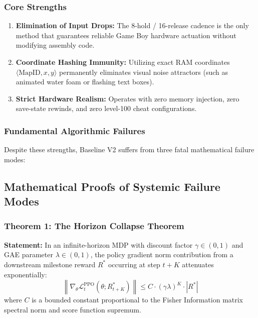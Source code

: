 \documentclass[conference]{IEEEtran}
\begin{document}
\subsubsection{Core Strengths}
\begin{enumerate}
    \item \textbf{Elimination of Input Drops:} The 8-hold / 16-release cadence is the only method that guarantees reliable Game Boy hardware actuation without modifying assembly code.
    \item \textbf{Coordinate Hashing Immunity:} Utilizing exact RAM coordinates $\langle \text{MapID}, x, y \rangle$ permanently eliminates visual noise attractors (such as animated water foam or flashing text boxes).
    \item \textbf{Strict Hardware Realism:} Operates with zero memory injection, zero save-state rewinds, and zero level-100 cheat configurations.
\end{enumerate}

\subsubsection{Fundamental Algorithmic Failures}
Despite these strengths, Baseline V2 suffers from three fatal mathematical failure modes:

\subsection{Mathematical Proofs of Systemic Failure Modes}

\subsubsection{Theorem 1: The Horizon Collapse Theorem}
\textbf{Statement:} In an infinite-horizon MDP with discount factor $\gamma \in (0, 1)$ and GAE parameter $\lambda \in (0, 1)$, the policy gradient norm contribution from a downstream milestone reward $R^*$ occurring at step $t+K$ attenuates exponentially:
\begin{equation}
\left\| \nabla_\theta \mathcal{L}_t^{\text{PPO}}(\theta; R_{t+K}^*) \right\| \le C \cdot (\gamma \lambda)^K \cdot |R^*|
\end{equation}
where $C$ is a bounded constant proportional to the Fisher Information matrix spectral norm and score function supremum.
\end{document}
